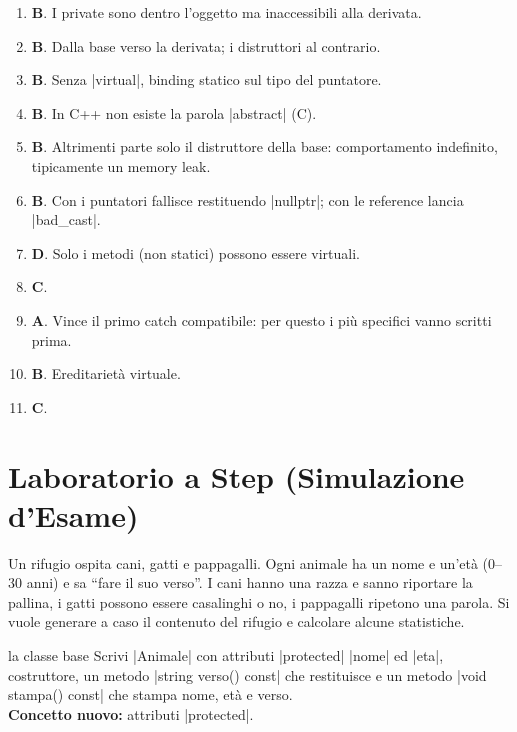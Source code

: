 \begin{soluzione}
\begin{enumerate}[label=\textbf{\arabic*.}]
  \item \textbf{B}. I private sono dentro l'oggetto ma inaccessibili alla derivata.
  \item \textbf{B}. Dalla base verso la derivata; i distruttori al contrario.
  \item \textbf{B}. Senza \cc|virtual|, binding statico sul tipo del puntatore.
  \item \textbf{B}. In C++ non esiste la parola \cc|abstract| (C).
  \item \textbf{B}. Altrimenti parte solo il distruttore della base: comportamento
        indefinito, tipicamente un memory leak.
  \item \textbf{B}. Con i puntatori fallisce restituendo \cc|nullptr|; con le
        reference lancia \cc|bad_cast|.
  \item \textbf{D}. Solo i metodi (non statici) possono essere virtuali.
  \item \textbf{C}.
  \item \textbf{A}. Vince il primo catch compatibile: per questo i più specifici vanno
        scritti prima.
  \item \textbf{B}. Ereditarietà virtuale.
  \item \textbf{C}.
\end{enumerate}
\end{soluzione}

\section{Laboratorio a Step (Simulazione d'Esame)}

\begin{traccia}
Un rifugio ospita cani, gatti e pappagalli. Ogni animale ha un nome e un'età (0--30
anni) e sa ``fare il suo verso''. I cani hanno una razza e sanno riportare la pallina, i
gatti possono essere casalinghi o no, i pappagalli ripetono una parola. Si vuole
generare a caso il contenuto del rifugio e calcolare alcune statistiche.
\end{traccia}

\begin{step}{la classe base}
Scrivi \cc|Animale| con attributi \cc|protected| \cc|nome| ed \cc|eta|, costruttore,
un metodo \cc|string verso() const| che restituisce  e un metodo
\cc|void stampa() const| che stampa nome, età e verso.\\[0.3em]
\textbf{Concetto nuovo:} attributi \cc|protected|.
\end{step}

